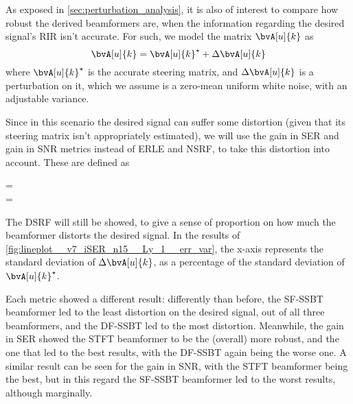 As exposed in \cref{sec:perturbation_analysis}, it is also of interest to compare how robust the derived beamformers are, when the information regarding the desired signal's RIR isn't accurate. For such, we model the matrix $\bvA[u]{k}$ as
\begin{equation}
	\bvA[u]{k} = \bvA[u]{k}^\star + \Delta\bvA[u]{k}
\end{equation}
where $\bvA[u]{k}^\star$ is the accurate steering matrix, and $\Delta\bvA[u]{k}$ is a perturbation on it, which we assume is a zero-mean uniform white noise, with an adjustable variance.

Since in this scenario the desired signal can suffer some distortion (given that its steering matrix isn't appropriately estimated), we will use the gain in SER and gain in SNR metrics instead of ERLE and NSRF, to take this distortion into account. These are defined as
\begin{subgather}
	\gser = \frac{\erle}{\dsrf} \\
	\gsnr = \frac{\nsrf}{\dsrf}
\end{subgather}

The DSRF will still be showed, to give a sense of proportion on how much the beamformer distorts the desired signal. In the results of \cref{fig:lineplot__v7_iSER_n15__Ly_1__err_var}, the x-axis represents the standard deviation of $\Delta\bvA[u]{k}$, as a percentage of the standard deviation of $\bvA[u]{k}^\star$.

Each metric showed a different result: differently than before, the SF-SSBT beamformer led to the least distortion on the desired signal, out of all three beamformers, and the DF-SSBT led to the most distortion. Meanwhile, the gain in SER showed the STFT beamformer to be the (overall) more robust, and the one that led to the best results, with the DF-SSBT again being the worse one. A similar result can be seen for the gain in SNR, with the STFT beamformer being the best, but in this regard the SF-SSBT beamformer led to the worst results, although marginally.